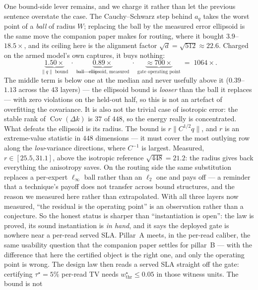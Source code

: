 \documentclass[11pt]{article}
\renewcommand{\_}{\WCorigunderscore\allowbreak}
\begin{document}
One bound-side lever remains, and we charge it rather than let the
previous sentence overstate the case. The Cauchy--Schwarz step behind
$a_q$ takes the worst point of a \emph{ball} of radius $W$; replacing
the ball by the measured error ellipsoid is the same move the
companion paper makes for routing, where it bought $3.9$--$18.5\times$,
and its ceiling here is the alignment factor
$\sqrt{d}=\sqrt{512}\approx22.6$. Charged on the armed model's own
captures, it buys nothing:
\begin{equation}
\underbrace{1.50\times}_{\|q\|\text{ bound}}
\;\cdot\;
\underbrace{0.89\times}_{\text{ball}\rightarrow\text{ellipsoid, measured}}
\;\cdot\;
\underbrace{\approx700\times}_{\text{gate operating point}}
\;=\;1064\times .
\label{eq:threelayer}
\end{equation}
The middle term is below one at the median and never usefully above it
($0.39$--$1.13$ across the $43$ layers) --- the ellipsoid bound is
\emph{looser} than the ball it replaces --- with zero violations on the
held-out half,
so this is not an artefact of overfitting the covariance. It is also not
the trivial case of isotropic error: the stable rank of $\operatorname{Cov}
(\Delta k)$ is $37$ of $448$, so the energy really is concentrated. What
defeats the ellipsoid is its radius. The bound is $r\|C^{1/2}q\|$, and
$r$ is an extreme-value statistic in $448$ dimensions --- it must cover
the most outlying row along the \emph{low}-variance directions, where
$C^{-1}$ is largest. Measured, $r\in[25.5,31.1]$, above the isotropic
reference $\sqrt{448}=21.2$: the radius gives back everything the
anisotropy saves. On the routing side the same substitution replaces a
per-expert $\ell_\infty$ ball rather than an $\ell_2$ one and pays off
--- a reminder that a technique's payoff does not transfer across bound
structures, and the reason we measured here rather than extrapolated. With all three
layers now measured, ``the residual is the operating point'' is an
observation rather than a conjecture. So the honest status is sharper than
``instantiation is open'': the law is proved, its sound instantiation is
\emph{in hand}, and it says the deployed gate is nowhere near a per-read
served SLA. Pillar~A meets, in the per-read caliber, the same usability
question that the companion paper settles for pillar~B --- with the
difference that here the certified object is the right one, and only the
operating point is wrong. The design law then reads a served SLA straight off the gate:
certifying $\tau^\star=5\%$ per-read TV needs
$w_{\mathrm{thr}}^\star\le0.05$ in those witness units. The bound is not
\end{document}
